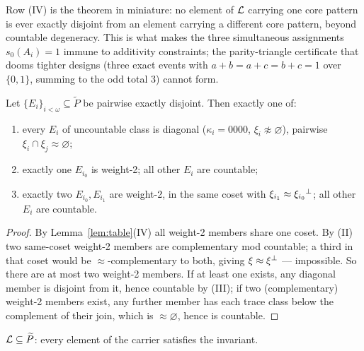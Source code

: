 Row (IV) is the theorem in miniature: no element of $\mathcal{L}$ carrying one core
pattern is ever exactly disjoint from an element carrying a different core
pattern, beyond countable degeneracy. This is what makes the three simultaneous
assignments $s_0(A_i)=1$ immune to additivity constraints; the parity-triangle
certificate that dooms tighter designs (three exact events with
$a+b=a+c=b+c=1$ over $\{0,1\}$, summing to the odd total $3$) cannot form.

\begin{lemma}\label{lem:trichotomy}
Let $\{E_i\}_{i<\omega}\subseteq\widetilde P$ be pairwise exactly disjoint. Then
exactly one of:
\begin{enumerate}[label=\textup{(\arabic*)}]
  \item every $E_i$ of uncountable class is diagonal ($\kappa_i=0000$,
    $\xi_i\not\approx\varnothing$), pairwise $\xi_i\cap\xi_j\approx\varnothing$;
  \item exactly one $E_{i_0}$ is weight-2; all other $E_i$ are countable;
  \item exactly two $E_{i_0},E_{i_1}$ are weight-2, in the same coset with
    $\xi_{i_1}\approx\xi_{i_0}{}^{\perp}$; all other $E_i$ are countable.
\end{enumerate}
\end{lemma}

\begin{proof}
By Lemma~\ref{lem:table}(IV) all weight-2 members share one coset. By (II) two
same-coset weight-2 members are complementary mod countable; a third in that
coset would be $\approx$-complementary to both, giving $\xi\approx\xi{}^{\perp}$ ---
impossible. So there are at most two weight-2 members. If at least one exists,
any diagonal member is disjoint from it, hence countable by (III); if two
(complementary) weight-2 members exist, any further member has each trace class
below the complement of their join, which is $\approx\varnothing$, hence is
countable.
\end{proof}

\begin{theorem}\label{thm:normal-form}
$\mathcal{L}\subseteq\widetilde P$: every element of the carrier satisfies the invariant.
\end{theorem}

